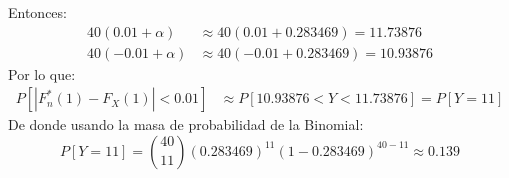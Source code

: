 \begin{ejercicio}
\begin{equation*}
    \end{equation*}
    Entonces:
    \begin{align*}
        40(0.01 + \alpha) &\approx 40(0.01+0.283469)= 11.73876 \\
        40(-0.01 + \alpha) &\approx 40(-0.01 + 0.283469)  = 10.93876
    \end{align*}
    Por lo que:
    \begin{align*}
        P[|F_n^\ast(1) - F_X(1)| < 0.01] &\approx P[10.93876 < Y < 11.73876] = P[Y=11]
    \end{align*}
    De donde usando la masa de probabilidad de la Binomial:
    \begin{equation*}
        P[Y=11] = \binom{40}{11} {(0.283469)}^{11} {(1-0.283469)}^{40-11} \approx 0.139
    \end{equation*}


\end{ejercicio}
